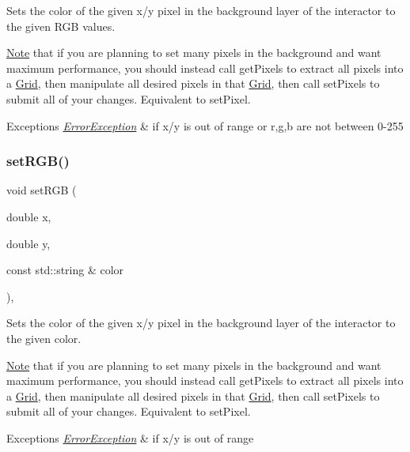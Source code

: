 Sets the color of the given x/y pixel in the background layer of the interactor to the given R\+GB values. 

\mbox{\hyperlink{classNote}{Note}} that if you are planning to set many pixels in the background and want maximum performance, you should instead call get\+Pixels to extract all pixels into a \mbox{\hyperlink{classGrid}{Grid}}, then manipulate all desired pixels in that \mbox{\hyperlink{classGrid}{Grid}}, then call set\+Pixels to submit all of your changes. Equivalent to set\+Pixel.


\begin{DoxyExceptions}{Exceptions}
{\em \mbox{\hyperlink{classErrorException}{Error\+Exception}}} & if x/y is out of range or r,g,b are not between 0-\/255 \\
\hline
\end{DoxyExceptions}
\mbox{\label{classGDrawingSurface_ae9a228792d4bb4b628350f39eaa3ad12}} 
\subsubsection{\texorpdfstring{set\+R\+G\+B()}{setRGB()}\hspace{0.1cm}{\footnotesize\ttfamily [3/3]}}
{\footnotesize\ttfamily void set\+R\+GB (\begin{DoxyParamCaption}\item[{double}]{x,  }\item[{double}]{y,  }\item[{const std\+::string \&}]{color }\end{DoxyParamCaption})\hspace{0.3cm}{\ttfamily [virtual]}, {\ttfamily [inherited]}}



Sets the color of the given x/y pixel in the background layer of the interactor to the given color. 

\mbox{\hyperlink{classNote}{Note}} that if you are planning to set many pixels in the background and want maximum performance, you should instead call get\+Pixels to extract all pixels into a \mbox{\hyperlink{classGrid}{Grid}}, then manipulate all desired pixels in that \mbox{\hyperlink{classGrid}{Grid}}, then call set\+Pixels to submit all of your changes. Equivalent to set\+Pixel.


\begin{DoxyExceptions}{Exceptions}
{\em \mbox{\hyperlink{classErrorException}{Error\+Exception}}} & if x/y is out of range \\
\hline
\end{DoxyExceptions}
\mbox{\label{classGInteractor_aca25d49481f9bf5fc8f7df4c086c4ce7}} 

